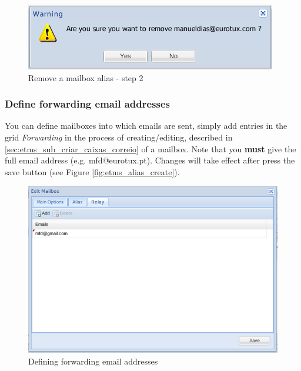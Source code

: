 \begin{figure}[H]
    \begin{center}
    \includegraphics[scale=0.6]{screenshots/etms/etms_alias_mailbox_delete_2.png}
    \caption{Remove a mailbox alias - step 2}
    \label{fig:etms_alias_mailbox_delete_2}
    \end{center}
\end{figure}

\subsubsection{Define forwarding email addresses}
\label{sec:etms_sub_encaminhamento_caixas_correio}
You can define mailboxes into which emails are sent, simply add entries in the grid \textit{Forwarding} in the process of creating/editing, described in \ref{sec:etms_sub_criar_caixas_correio} of a mailbox. Note that you \textbf{must} give the full email address (e.g. mfd@eurotux.pt). Changes will take effect after press the save button (see Figure \ref{fig:etms_alias_create}).

\begin{figure}[H]
    \begin{center}
    \includegraphics[scale=0.45]{screenshots/etms/etms_forwarding_mb_del.png}
    \caption{Defining forwarding email addresses}
    \label{fig:etms_forwarding_mb_del}
    \end{center}
\end{figure}

